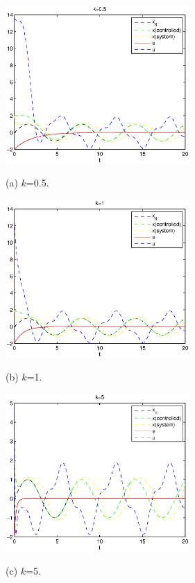 \documentclass[12pt,a4paper]{article}
\begin{document}
\begin{figure}
\begin{minipage}{0.48\linewidth}\footnotesize
  \centerline{\includegraphics[width=7cm]{figs/emk0_5.eps}}
  \centerline{(a) $k$=0.5.}
\end{minipage}
\hfill
\begin{minipage}{0.48\linewidth}\footnotesize
  \centerline{\includegraphics[width=7cm]{figs/emk1.eps}}
  \centerline{(b) $k$=1.}
\end{minipage}
\vfill
\begin{minipage}{0.48\linewidth}\footnotesize
  \centerline{\includegraphics[width=7cm]{figs/emk5.eps}}
  \centerline{(c) $k$=5.}
\end{minipage}
\hfill
\begin{minipage}{0.48\linewidth}\footnotesize

\end{minipage}
\end{figure}
\end{document}
